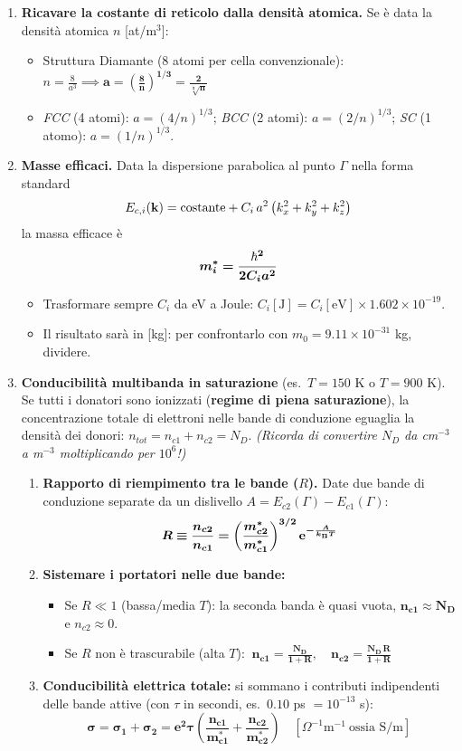 \begin{enumerate}
\item \textbf{Ricavare la costante di reticolo dalla densità atomica.}
Se è data la densità atomica $n$ [at/m$^3$]:
\begin{itemize}
    \item Struttura Diamante (8 atomi per cella convenzionale): $n=\frac{8}{a^3}\implies \bm{a=\left(\frac8n\right)^{1/3}=\frac{2}{\sqrt[3]{n}}}$
    \item \textit{FCC} (4 atomi): $a=(4/n)^{1/3}$; \quad \textit{BCC} (2 atomi): $a=(2/n)^{1/3}$; \quad \textit{SC} (1 atomo): $a=(1/n)^{1/3}$.
\end{itemize}

\item \textbf{Masse efficaci.} Data la dispersione parabolica al punto $\Gamma$ nella forma standard
\[ E_{c,i}(\mathbf{k})=\text{costante}+C_i\,a^2\left(k_x^2+k_y^2+k_z^2\right) \]
la massa efficace è
\[ \bm{m_i^* = \frac{\hbar^2}{2C_ia^2}} \]
\begin{itemize}
    \item Trasformare sempre $C_i$ da eV a Joule: $C_i[\text{J}]=C_i[\text{eV}]\times1.602\times10^{-19}$.
    \item Il risultato sarà in [kg]: per confrontarlo con $m_0=9.11\times10^{-31}$ kg, dividere.
\end{itemize}

\item \textbf{Conducibilità multibanda in saturazione} (es.\ $T=150$ K o $T=900$ K).
Se tutti i donatori sono ionizzati (\textbf{regime di piena saturazione}), la concentrazione totale di elettroni nelle bande di conduzione eguaglia la densità dei donori: $n_{tot}=n_{c1}+n_{c2}=N_D$.
\textit{(Ricorda di convertire $N_D$ da cm$^{-3}$ a m$^{-3}$ moltiplicando per $10^6$!)}
\begin{enumerate}
    \item \textbf{Rapporto di riempimento tra le bande ($R$).} Date due bande di conduzione separate da un dislivello $A=E_{c2}(\Gamma)-E_{c1}(\Gamma)$:
    \[ \bm{R\equiv\frac{n_{c2}}{n_{c1}} = \left(\frac{m_{c2}^*}{m_{c1}^*}\right)^{3/2}\mathrm{e}^{-\frac{A}{k_{\mathrm{B}} T}}} \]
    \item \textbf{Sistemare i portatori nelle due bande:}
    \begin{itemize}
        \item Se $R\ll1$ (bassa/media $T$): la seconda banda è quasi vuota, $\bm{n_{c1}\approx N_D}$ e $n_{c2}\approx0$.
        \item Se $R$ non è trascurabile (alta $T$): $\ \bm{n_{c1}=\frac{N_D}{1+R}}, \quad \bm{n_{c2}=\frac{N_D\,R}{1+R}}$
    \end{itemize}
    \item \textbf{Conducibilità elettrica totale:} si sommano i contributi indipendenti delle bande attive (con $\tau$ in secondi, es.\ $0.10$ ps $=10^{-13}$ s):
    \[ \bm{\sigma = \sigma_1+\sigma_2 = e^2\tau\left(\frac{n_{c1}}{m_{c1}^*}+\frac{n_{c2}}{m_{c2}^*}\right)}\quad [\Omega^{-1}\text{m}^{-1}\ \text{ossia S/m}] \]
\end{enumerate}


\end{enumerate}
